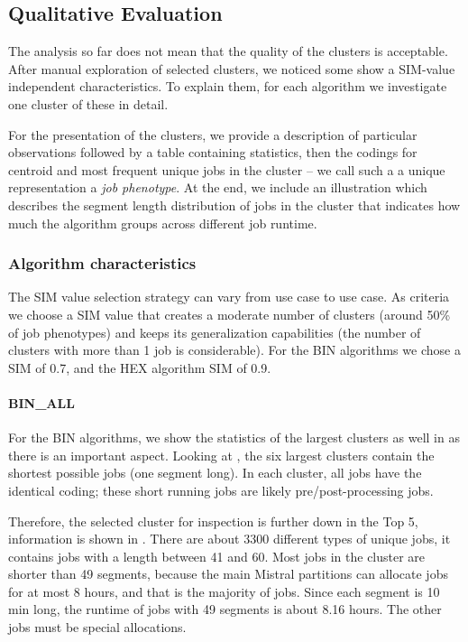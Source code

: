 \documentclass{jhps}
\begin{document}
\subsection{Qualitative Evaluation}
The analysis so far does not mean that the quality of the clusters is acceptable.
After manual exploration of selected clusters, we noticed some show a SIM-value independent characteristics.
To explain them, for each algorithm we investigate one cluster of these in detail.

For the presentation of the clusters, we provide a description of particular observations followed by a table containing statistics, then the codings for centroid and most frequent unique jobs in the cluster -- we call such a a unique representation a \textit{job phenotype}.
At the end, we include an illustration which describes the segment length distribution of jobs in the cluster that indicates how much the algorithm groups across different job runtime.

\subsubsection{Algorithm characteristics}
The SIM value selection strategy can vary from use case to use case.
As criteria we choose a SIM value that creates a moderate number of clusters (around 50\% of job phenotypes) and keeps its generalization capabilities (the number of clusters with more than 1 job is considerable).
For the BIN algorithms we chose a SIM of 0.7, and the HEX algorithm SIM of 0.9.

\FloatBarrier
\paragraph{BIN\_ALL}
For the BIN algorithms, we show the statistics of the largest clusters as well in  as there is an important aspect.
Looking at , the six largest clusters contain the shortest possible jobs (one segment long).
In each cluster, all jobs have the identical coding; these short running jobs are likely pre/post-processing jobs.

Therefore, the selected cluster for inspection is further down in the Top 5, information is shown in .
There are about 3300 different types of unique jobs, it contains jobs with a length between 41 and 60.
Most jobs in the cluster are shorter than 49 segments, because the main Mistral partitions can allocate jobs for at most 8 hours, and that is the majority of jobs.
Since each segment is 10 min long, the runtime of jobs with 49 segments is about 8.16 hours.
The other jobs must be special allocations.
\end{document}
